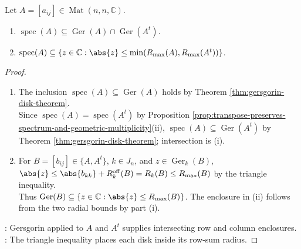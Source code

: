 \begin{corollary} \label{cor:gersgorin-row-column-refinement} \\
Let $A=[a_{ij}]\in\operatorname{Mat}(n,n,\mathbb{C})$.
\begin{enumerate}[label=(\roman*)]
\setlength{\itemsep}{0pt}
\item $\operatorname{spec}(A)\subseteq\operatorname{Ger}(A)\cap\operatorname{Ger}(A^t)$.
\item $\operatorname{spec}(A)\subseteq\{z\in\mathbb{C}:\abs{z}\leq\min(R_{\max}(A),R_{\max}(A^t))\}$.
\end{enumerate}
\begin{proof}
\begin{enumerate}[label=(\roman*)]
\setlength{\itemsep}{0pt}
\item[$(i)$] The inclusion $\operatorname{spec}(A)\subseteq\operatorname{Ger}(A)$ holds by Theorem \ref{thm:gersgorin-disk-theorem}.\\
Since $\operatorname{spec}(A)=\operatorname{spec}(A^t)$ by Proposition \ref{prop:transpose-preserves-spectrum-and-geometric-multiplicity}(ii), $\operatorname{spec}(A)\subseteq\operatorname{Ger}(A^t)$ by Theorem \ref{thm:gersgorin-disk-theorem}; intersection is (i).
\item[$(ii)$] For $B=[b_{ij}]\in\{A,A^t\}$, $k\in J_n$, and $z\in\operatorname{Ger}_k(B)$, $\abs{z}\leq\abs{b_{kk}}+R_k^{\mathrm{off}}(B)=R_k(B)\leq R_{\max}(B)$ by the triangle inequality.\\
Thus $\operatorname{Ger}(B)\subseteq\{z\in\mathbb{C}:\abs{z}\leq R_{\max}(B)\}$. The enclosure in (ii) follows from the two radial bounds by part (i).
\end{enumerate}
: Gersgorin applied to $A$ and $A^t$ supplies intersecting row and column enclosures.\\
: The triangle inequality places each disk inside its row-sum radius.
\end{proof}
\end{corollary}

